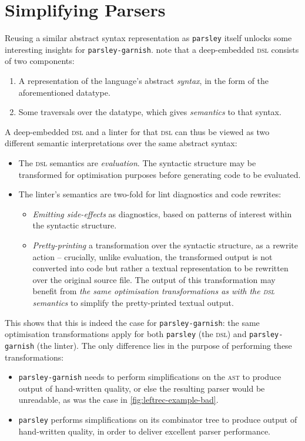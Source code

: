 \documentclass[../../../main.tex]{subfiles}
\begin{document}
\section{Simplifying Parsers}\label{sec:simplify-parsers}

Reusing a similar abstract syntax representation as \texttt{parsley} itself unlocks some interesting insights for \texttt{parsley-garnish}.
\textcite{gibbons_dsls_2014} note that a deep-embedded \textsc{dsl} consists of two components:
\begin{enumerate}
  \item A representation of the language's abstract \emph{syntax}, in the form of the aforementioned datatype.
  \item Some traversals over the datatype, which gives \emph{semantics} to that syntax.
\end{enumerate}
%
A deep-embedded \textsc{dsl} and a linter for that \textsc{dsl} can thus be viewed as two different semantic interpretations over the same abstract syntax:
\begin{itemize}
  \item The \textsc{dsl} semantics are \emph{evaluation}. The syntactic structure may be transformed for optimisation purposes before generating code to be evaluated. %
  \item The linter's semantics are two-fold for lint diagnostics and code rewrites:
  \begin{itemize}
    \item \emph{Emitting side-effects} as diagnostics, based on patterns of interest within the syntactic structure.
    \item \emph{Pretty-printing} a transformation over the syntactic structure, as a rewrite action -- crucially, unlike evaluation, the transformed output is not converted into code but rather a textual representation to be rewritten over the original source file. The output of this transformation may benefit from \emph{the same optimisation transformations as with the \textsc{dsl} semantics} to simplify the pretty-printed textual output.
  \end{itemize}
\end{itemize}
%
This  shows that this is indeed the case for \texttt{parsley-garnish}:
the same optimisation transformations apply for both \texttt{parsley} (the \textsc{dsl}) and \texttt{parsley-garnish} (the linter).
The only difference lies in the purpose of performing these transformations:
\begin{itemize}
  \item \texttt{parsley-garnish} needs to perform simplifications on the  \textsc{ast} to produce output of hand-written quality, or else the resulting parser would be unreadable, as was the case in \cref{fig:leftrec-example-bad}.
  \item \texttt{parsley} performs simplifications on its combinator tree to produce output of hand-written quality, in order to deliver excellent parser performance.
\end{itemize}
\end{document}
